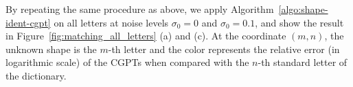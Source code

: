 By repeating the same procedure as above, we apply
Algorithm~\ref{algo:shape-ident-cgpt} on all letters at noise
levels $\sigma_0=0$ and $\sigma_0=0.1$, and show the result in
Figure~\ref{fig:matching_all_letters} (a) and (c). At the
coordinate $(m,n)$, the unknown shape is the $m$-th letter and the
color represents the relative error (in logarithmic scale) of the
CGPTs when compared with the $n$-th standard letter of the
dictionary.


\begin{figure}[htp]
  \centering

\end{figure}
